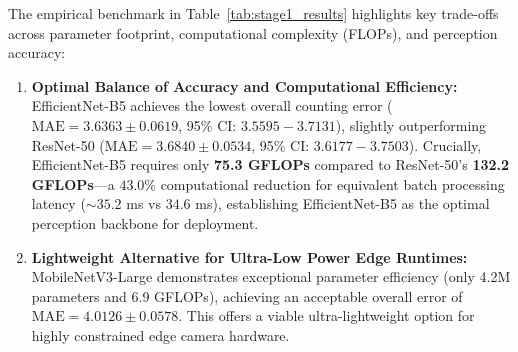 \documentclass[preprint,12pt]{elsarticle}
\begin{document}
\begin{table}[h]
\centering
\footnotesize
\setlength{\tabcolsep}{4pt}
\renewcommand{\arraystretch}{1.2}
\caption{Stage 1 Vehicle Count Estimation Benchmark ($\text{Mean} \pm \text{Std}$ across 5 seeds). Latency is measured per batch ($B=32$).}
\label{tab:stage1_results}
\end{table}

The empirical benchmark in Table~\ref{tab:stage1_results} highlights key trade-offs across parameter footprint, computational complexity (FLOPs), and perception accuracy:
\begin{enumerate}
    \item \textbf{Optimal Balance of Accuracy and Computational Efficiency:} EfficientNet-B5 achieves the lowest overall counting error ($\text{MAE} = 3.6363 \pm 0.0619$, 95\% CI: $3.5595 - 3.7131$), slightly outperforming ResNet-50 ($\text{MAE} = 3.6840 \pm 0.0534$, 95\% CI: $3.6177 - 3.7503$). Crucially, EfficientNet-B5 requires only \textbf{75.3 GFLOPs} compared to ResNet-50's \textbf{132.2 GFLOPs}---a $43.0\%$ computational reduction for equivalent batch processing latency ($\sim 35.2$ ms vs $34.6$ ms), establishing EfficientNet-B5 as the optimal perception backbone for deployment.
    \item \textbf{Lightweight Alternative for Ultra-Low Power Edge Runtimes:} MobileNetV3-Large demonstrates exceptional parameter efficiency (only 4.2M parameters and 6.9 GFLOPs), achieving an acceptable overall error of $\text{MAE} = 4.0126 \pm 0.0578$. This offers a viable ultra-lightweight option for highly constrained edge camera hardware.
\end{enumerate}
\end{document}
